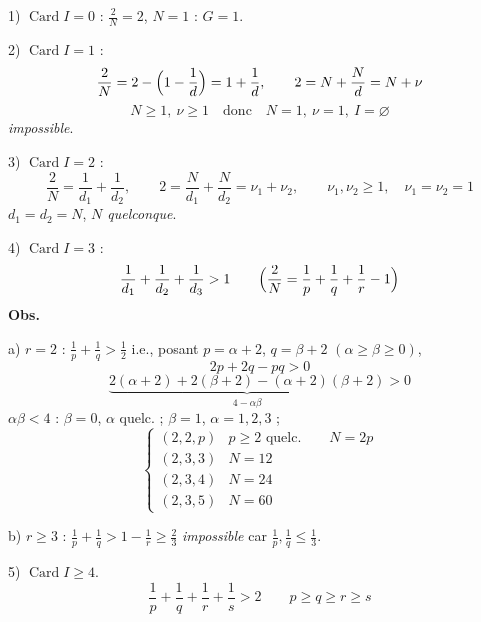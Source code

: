 \documentclass[11pt,a4paper]{article}
\begin{document}
1) $\operatorname{Card} I = 0$ : $\frac{2}{N} = 2$, $N = 1$ :  $G = 1$.

2) $\operatorname{Card} I = 1$ :
\[
  \frac{2}{N} = 2 - \Bigl(1 - \frac{1}{d}\Bigr) = 1 + \frac{1}{d}, \qquad
  2 = N + \frac{N}{d} = N + \nu
\]
\[
  N \geqslant 1,\ \nu \geqslant 1 \quad\text{donc}\quad N = 1,\ \nu = 1,\ I = \varnothing
\]
\emph{impossible}.

3) $\operatorname{Card} I = 2$ :
\[
  \frac{2}{N} = \frac{1}{d_1} + \frac{1}{d_2}, \qquad
  2 = \frac{N}{d_1} + \frac{N}{d_2} = \nu_1 + \nu_2, \qquad
  \nu_1, \nu_2 \geqslant 1, \quad \nu_1 = \nu_2 = 1
\]
$d_1 = d_2 = N$, \emph{$N$ quelconque}.

4) $\operatorname{Card} I = 3$ : 
\[
  \frac{1}{d_1} + \frac{1}{d_2} + \frac{1}{d_3} > 1 \qquad
  \Bigl( \frac{2}{N} = \frac{1}{p} + \frac{1}{q} + \frac{1}{r} - 1 \Bigr)
\]
\textbf{Obs.} 

a) $r = 2$ :
$\frac{1}{p} + \frac{1}{q} > \frac{1}{2}$ i.e., posant $p = \alpha + 2$,
$q = \beta + 2$ $(\alpha \geqslant \beta \geqslant 0)$,
\[
  2p + 2q - pq > 0
\]
\struck{\ill{}}
\[
  \underbrace{2(\alpha + 2) + 2(\beta + 2) - (\alpha + 2)(\beta + 2)}_{4 - \alpha\beta} > 0
\]
$\alpha\beta < 4$ :
$\beta = 0$, $\alpha$ quelc. ; $\beta = 1$, $\alpha = 1, 2, 3$ ;
\[
  \begin{cases}
    (2, 2, p) & p \geqslant 2 \text{ quelc.} \qquad N = 2p \\
    (2, 3, 3) & N = 12 \\
    (2, 3, 4) & N = 24 \\
    (2, 3, 5) & N = 60
  \end{cases}
\]

b) $r \geqslant 3$ :
$\frac{1}{p} + \frac{1}{q} > 1 - \frac{1}{r} \geqslant \frac{2}{3}$
\emph{impossible} car $\frac{1}{p}, \frac{1}{q} \leqslant \frac{1}{3}$.

5) $\operatorname{Card} I \geqslant 4$. 
\[
  \frac{1}{p} + \frac{1}{q} + \frac{1}{r} + \frac{1}{s} > 2
  \qquad p \geqslant q \geqslant r \geqslant s
\]
\end{document}
